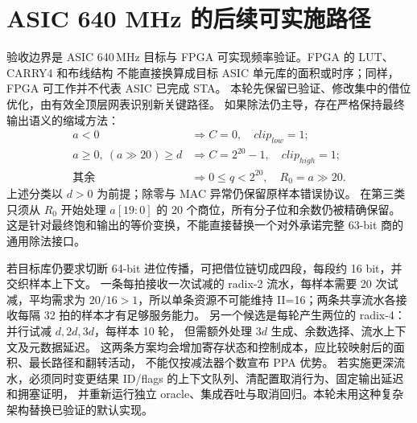 \section{ASIC 640 MHz 的后续可实施路径}
验收边界是 ASIC 640\,MHz 目标与 FPGA 可实现频率验证。FPGA 的 LUT、CARRY4 和布线结构
不能直接换算成目标 ASIC 单元库的面积或时序；同样，FPGA 可工作并不代表 ASIC 已完成 STA。
本轮先保留已验证、修改集中的借位优化，由有效全顶层网表识别新关键路径。
如果除法仍主导，存在严格保持最终输出语义的缩域方法：
\begin{equation}
\begin{split}
a<0&\Rightarrow C=0,\quad clip_{low}=1;\\
a\ge0,\ (a\gg20)\ge d&\Rightarrow C=2^{20}-1,\quad clip_{high}=1;\\
\text{其余}&\Rightarrow 0\le q<2^{20},\quad R_0=a\gg20.
\end{split}
\end{equation}
上述分类以 $d>0$ 为前提；除零与 MAC 异常仍保留原样本错误协议。
在第三类只须从 $R_0$ 开始处理 $a[19:0]$ 的 20 个商位，所有分子位和余数仍被精确保留。
这是针对最终饱和输出的等价变换，不能直接替换一个对外承诺完整 63-bit 商的通用除法接口。

若目标库仍要求切断 64-bit 进位传播，可把借位链切成四段，每段约 16 bit，并交织样本上下文。
一条每拍接收一次试减的 radix-2 流水，每样本需要 20 次试减，平均需求为
$20/16>1$，所以单条资源不可能维持 II=16；两条共享流水各接收每隔 32 拍的样本才有足够服务能力。
另一个候选是每轮产生两位的 radix-4：并行试减 $d,2d,3d$，每样本 10 轮，
但需额外处理 $3d$ 生成、余数选择、流水上下文及元数据延迟。
这两条方案均会增加寄存状态和控制成本，应比较映射后的面积、最长路径和翻转活动，
不能仅按减法器个数宣布 PPA 优势。
若实施更深流水，必须同时变更结果 ID/flags 的上下文队列、清配置取消行为、固定输出延迟和拥塞证明，
并重新运行独立 oracle、集成吞吐与取消回归。本轮未用这种复杂架构替换已验证的默认实现。
